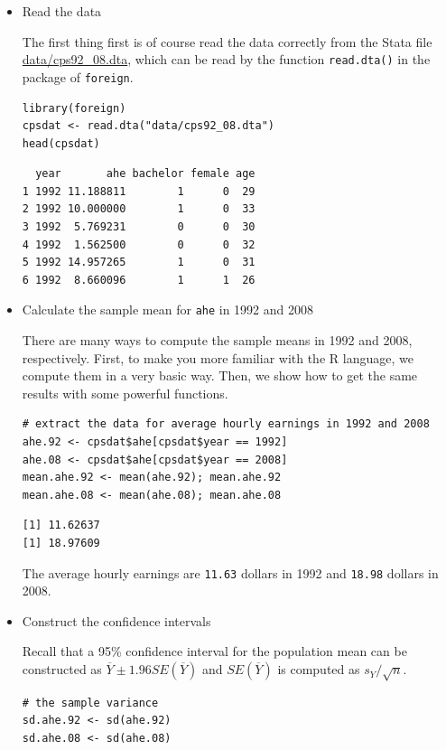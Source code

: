\documentclass[a4paper,11pt]{article}
\begin{document}
\begin{itemize}
\item Read the data
\label{sec:org32be625}

The first thing first is of course read the data correctly from the
Stata file \url{data/cps92\_08.dta}, which can be read by the function
\texttt{read.dta()} in the package of \texttt{foreign}.

\begin{verbatim}
library(foreign)
cpsdat <- read.dta("data/cps92_08.dta")
head(cpsdat)
\end{verbatim}

\begin{verbatim}
  year       ahe bachelor female age
1 1992 11.188811        1      0  29
2 1992 10.000000        1      0  33
3 1992  5.769231        0      0  30
4 1992  1.562500        0      0  32
5 1992 14.957265        1      0  31
6 1992  8.660096        1      1  26
\end{verbatim}

\item Calculate the sample mean for \texttt{ahe} in 1992 and 2008
\label{sec:orgb46c018}

There are many ways to compute the sample means in 1992 and 2008,
respectively. First, to make you more familiar with the  R
language, we compute them in a very basic way. Then, we show how to
get the same results with some powerful functions.

\begin{verbatim}
# extract the data for average hourly earnings in 1992 and 2008
ahe.92 <- cpsdat$ahe[cpsdat$year == 1992]
ahe.08 <- cpsdat$ahe[cpsdat$year == 2008]
mean.ahe.92 <- mean(ahe.92); mean.ahe.92
mean.ahe.08 <- mean(ahe.08); mean.ahe.08
\end{verbatim}

\begin{verbatim}
[1] 11.62637
[1] 18.97609
\end{verbatim}

The average hourly earnings are \texttt{11.63} dollars
in 1992 and \texttt{18.98} dollars in 2008.

\item Construct the confidence intervals
\label{sec:org8e4622b}

Recall that a 95\% confidence interval for the population mean can be
constructed as \(\overline{Y} \pm 1.96 SE(\overline{Y})\) and
\(SE(\overline{Y})\) is computed as \(s_Y / \sqrt{n}\).

\begin{verbatim}
# the sample variance
sd.ahe.92 <- sd(ahe.92)
sd.ahe.08 <- sd(ahe.08)


\end{verbatim}
\end{itemize}
\end{document}
